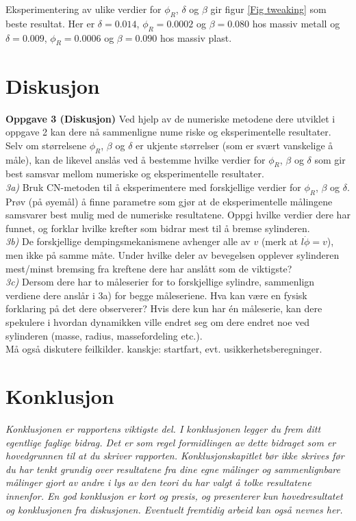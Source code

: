 \documentclass[5p]{elsarticle}
\begin{document}
Eksperimentering av ulike verdier for \(\phi_R\), \(\delta\) og \(\beta\) gir figur \ref{Fig tweaking} som beste resultat. Her er \(\delta = 0.014\), \(\phi_R = 0.0002\) og \(\beta = 0.080\) hos massiv metall og \(\delta = 0.009\), \(\phi_R = 0.0006\) og \(\beta = 0.090\) hos massiv plast.

\section{Diskusjon}
\textbf{Oppgave 3 (Diskusjon)}
Ved hjelp av de numeriske metodene dere utviklet i oppgave 2 kan dere nå sammenligne nume
riske og eksperimentelle resultater. Selv om størrelsene \(\phi_R\), \(\beta\) og \(\delta\) er ukjente størrelser (som er
svært vanskelige å måle), kan de likevel anslås ved å bestemme hvilke verdier for \(\phi_R\), \(\beta\) og \(\delta\) som
gir best samsvar mellom numeriske og eksperimentelle resultater.
\\\textit{3a)} Bruk CN-metoden til å eksperimentere med forskjellige verdier for \(\phi_R\), \(\beta\) og \(\delta\). Prøv (på
øyemål) å finne parametre som gjør at de eksperimentelle målingene samsvarer best mulig med
de numeriske resultatene. Oppgi hvilke verdier dere har funnet, og forklar hvilke krefter som
bidrar mest til å bremse sylinderen.
\\\textit{3b)} De forskjellige dempingsmekanismene avhenger alle av \(v\) (merk at \(l\dot{\phi} = v\)), men ikke på
samme måte. Under hvilke deler av bevegelsen opplever sylinderen mest/minst bremsing fra
kreftene dere har anslått som de viktigste?
\\\textit{3c)} Dersom dere har to måleserier for to forskjellige sylindre, sammenlign verdiene dere anslår
i 3a) for begge måleseriene. Hva kan være en fysisk forklaring på det dere observerer? Hvis dere
kun har én måleserie, kan dere spekulere i hvordan dynamikken ville endret seg om dere endret
noe ved sylinderen (masse, radius, massefordeling etc.).
\\Må også diskutere feilkilder. kanskje: startfart, evt. usikkerhetsberegninger.


\section{Konklusjon}
\textit{
Konklusjonen er rapportens viktigste del. 
I konklusjonen legger du frem ditt egentlige faglige bidrag. 
Det er som regel formidlingen av dette bidraget som er hovedgrunnen til at du skriver rapporten. 
Konklusjonskapitlet bør ikke skrives før du har tenkt grundig over resultatene fra dine egne målinger 
og sammenlignbare målinger gjort av andre i lys av den teori du har valgt å tolke resultatene innenfor.
En god konklusjon er kort og presis, og presenterer kun hovedresultatet og konklusjonen fra diskusjonen. 
Eventuelt fremtidig arbeid kan også nevnes her. 
}
\end{document}
